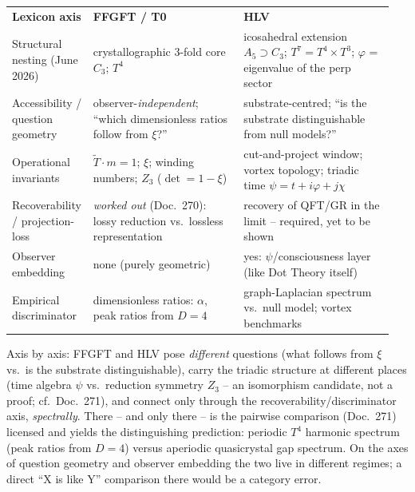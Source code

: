 \begin{center}
\small
\begin{tabular}{@{}p{0.17\linewidth}p{0.39\linewidth}p{0.39\linewidth}@{}}
\hline
\textbf{Lexicon axis} & \textbf{FFGFT / T0} & \textbf{HLV}\\
Structural nesting (June 2026)
& crystallographic $3$-fold core $C_3$; $T^4$
& icosahedral extension $A_5\supset C_3$; $T^7=T^4{\times}T^3$; $\varphi$ = eigenvalue of the perp sector\\
\hline
Accessibility / question geometry
& observer-\emph{independent}; \enquote{which dimensionless ratios follow from $\xi$?}
& substrate-centred; \enquote{is the substrate distinguishable from null models?}\\
Operational invariants
& $\tilde T\cdot m=1$; $\xi$; winding numbers; $Z_3$ ($\det=1-\xi$)
& cut-and-project window; vortex topology; triadic time $\psi=t+i\varphi+j\chi$\\
Recoverability / projection-loss
& \emph{worked out} (Doc.~270): lossy reduction vs.\ lossless representation
& recovery of QFT/GR in the limit -- required, yet to be shown\\
Observer embedding
& none (purely geometric)
& yes: $\psi$/consciousness layer (like Dot Theory itself)\\
Empirical discriminator
& dimensionless ratios: $\alpha$, peak ratios from $D=4$
& graph-Laplacian spectrum vs.\ null model; vortex benchmarks\\
\hline
\end{tabular}
\end{center}

Axis by axis: FFGFT and HLV pose \emph{different} questions (what follows from $\xi$ vs.\ is the substrate
distinguishable), carry the triadic structure at different places (time algebra $\psi$ vs.\ reduction symmetry
$Z_3$ -- an isomorphism candidate, not a proof; cf.\ Doc.~271), and connect only through the
recoverability/discriminator axis, \emph{spectrally}. There -- and only there -- is the pairwise comparison
(Doc.~271) licensed and yields the distinguishing prediction: periodic $T^4$ harmonic spectrum (peak ratios
from $D=4$) versus aperiodic quasicrystal gap spectrum. On the axes of question geometry and observer embedding
the two live in different regimes; a direct \enquote{X is like Y} comparison there would be a category error.


